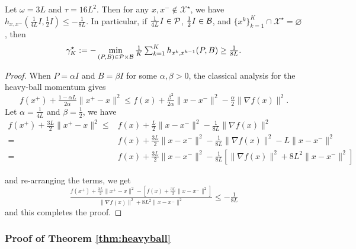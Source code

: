 \begin{lem} \label{lem:heavyball-hindsight}
Let $\omega = 3 L$ and $\tau = 16 L^2$. Then for any $x, x^- \nin  \mathcal{X}^{\star}$, we have $h_{x, x^-} ( \tfrac{1}{4 L} I, \tfrac{1}{2} I ) \leq - \tfrac{1}{8 L}$. 
In particular, if $\tfrac{1}{4L}I \in \mathcal{P}$, $\tfrac{1}{2}I \in \mathcal{B}$, and $\{x^k\}_{k=1}^K \cap \mathcal{X}^{\star} = \varnothing$, then 
\begin{equation*}
  \gamma_K^{\star} := - \min_{(P, B) \in \mathcal{P} \times \mathcal{B}} \tfrac{1}{K} \textstyle \sum_{k=1}^K h_{x^k, x^{k-1}}(P, B) \geq \tfrac{1}{8 L}.
\end{equation*}
\end{lem}
\begin{proof}
When $P = \alpha I$ and $B = \beta I$ for some $\alpha, \beta > 0$, the classical analysis for the heavy-ball momentum \cite{danilova2020non} gives
\begin{equation*}
f (x^+) + \tfrac{1 - \alpha L}{2 \alpha} \| x^+ - x \|^2 \leq f (x) + \tfrac{\beta^2}{2 \alpha} \| x - x^- \|^2 - \tfrac{\alpha}{2} \| \nabla f (x) \|^2 .
\end{equation*}
Let $\alpha = \tfrac{1}{4 L}$ and $\beta = \tfrac{1}{2}$, we have
\begin{align}
  f (x^+) + \tfrac{3 L}{2} \| x^+ - x \|^2 
  \leq{}& f (x) + \tfrac{L}{2} \| x -
  x^- \|^2 - \tfrac{1}{8 L} \| \nabla f (x) \|^2 \nonumber\\
  ={}& f (x) + \tfrac{3 L}{2} \| x - x^- \|^2 - \tfrac{1}{8 L} \| \nabla f (x)
  \|^2 - L \| x - x^- \|^2 \nonumber\\
  ={}& f (x) + \tfrac{3 L}{2} \| x - x^- \|^2 - \tfrac{1}{8 L} [\| \nabla f (x)
  \|^2 + 8 L^2 \| x - x^- \|^2] \nonumber
\end{align}

and re-arranging the terms, we get
\[ \tfrac{f (x^+) + \frac{3 L}{2} \| x^+ - x \|^2 - [ f (x) + \frac{3
   L}{2} \| x - x^- \|^2 ]}{\| \nabla f (x) \|^2 + 8 L^2 \| x - x^-
   \|^2} \leq - \tfrac{1}{8 L} \]
and this completes the proof.
\end{proof}


\subsubsection{Proof of Theorem \ref{thm:heavyball}}


